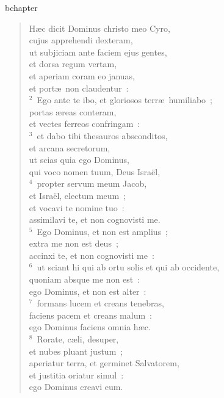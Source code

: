 bchapter\begin{verse}\vspace{-19pt}H\ae c dicit Dominus christo meo Cyro,\\ cujus apprehendi dexteram,\\ ut subjiciam ante faciem ejus gentes,\\ et dorsa regum vertam,\\ et aperiam coram eo januas,\\ et port\ae\ non claudentur~:\\
${}^{2}$~Ego ante te ibo, et gloriosos terr\ae\ humiliabo~;\\ portas \ae reas conteram,\\ et vectes ferreos confringam~:\\
${}^{3}$~et dabo tibi thesauros absconditos,\\ et arcana secretorum,\\ ut scias quia ego Dominus,\\ qui voco nomen tuum, Deus Isra\"el,\\
${}^{4}$~propter servum meum Jacob,\\ et Isra\"el, electum meum~;\\ et vocavi te nomine tuo~:\\ assimilavi te, et non cognovisti me.\\
${}^{5}$~Ego Dominus, et non est amplius~;\\ extra me non est deus~;\\ accinxi te, et non cognovisti me~:\\
${}^{6}$~ut sciant hi qui ab ortu solis et qui ab occidente,\\ quoniam absque me non est~:\\ ego Dominus, et non est alter~:\\
${}^{7}$~formans lucem et creans tenebras,\\ faciens pacem et creans malum~:\\ ego Dominus faciens omnia h\ae c.\\
${}^{8}$~Rorate, c\ae li, desuper,\\ et nubes pluant justum~;\\ aperiatur terra, et germinet Salvatorem,\\ et justitia oriatur simul~:\\ ego Dominus creavi eum.\end{verse}


